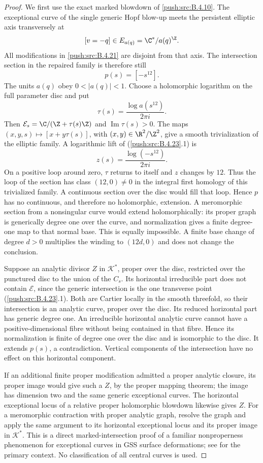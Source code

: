 \begin{proof}
We first use the exact marked blowdown of \ref{push:src:B.4.10}.
The exceptional curve of the single generic Hopf blow-up
meets the persistent elliptic axis transversely at
\[
 [v=-q]\in E_{a(q)}=\C^*/a(q)^{\Z}.
\]
All modifications in \ref{push:src:B.4.21} are disjoint from that axis.
The intersection section in the repaired family is therefore
still
\[
 p(s)=[-s^{12}].                                      \tag{B.4.23.1}
\]
The units $a(q)$ obey $0<|a(q)|<1$. Choose a holomorphic
logarithm on the full parameter disc and put
\[
 \tau(s)=\frac{\log a(s^{12})}{2\pi i}.
\]
Then $\mathcal E_s=\C/(\Z+\tau(s)\Z)$ and
$\operatorname{Im}\tau(s)>0$. The maps
$(x,y,s)\mapsto[x+y\tau(s)]$, with $(x,y)\in\R^2/\Z^2$,
give a smooth trivialization of the elliptic family.
A logarithmic lift of (\ref{push:src:B.4.23}.1) is
\[
 z(s)=\frac{\log(-s^{12})}{2\pi i}.
\]
On a positive loop around zero, $\tau$ returns to itself
and $z$ changes by $12$. Thus the loop of the section has
class $(12,0)\ne0$ in the integral first homology of this
trivialized family. A continuous section over the disc
would fill that loop. Hence $p$ has no continuous, and
therefore no holomorphic, extension. A meromorphic section
from a nonsingular curve would extend holomorphically:
its proper graph is generically degree one over the curve,
and normalization gives a finite degree-one map to that
normal base. This is equally impossible. A finite base
change of degree $d>0$ multiplies the winding to $(12d,0)$
and does not change the conclusion.

Suppose an analytic divisor $Z$ in $\mathcal K^*$, proper
over the disc, restricted over the punctured disc to the
union of the $C_s$. Its horizontal irreducible part does
not contain $\mathcal E$, since the generic intersection
is the one transverse point (\ref{push:src:B.4.23}.1). Both are Cartier
locally in the smooth threefold, so their intersection
is an analytic curve, proper over the disc. Its reduced
horizontal part has generic degree one. An irreducible
horizontal analytic curve cannot have a positive-dimensional
fibre without being contained in that fibre. Hence its
normalization is finite of degree one over the disc and
is isomorphic to the disc. It extends $p(s)$, a
contradiction. Vertical components of the intersection
have no effect on this horizontal component.

If an additional finite proper modification admitted a
proper analytic closure, its proper image would give
such a $Z$, by the proper mapping theorem; the image has
dimension two and the same generic exceptional curves.
The horizontal exceptional locus of a relative proper
holomorphic blowdown likewise gives $Z$. For a meromorphic
contraction with proper analytic graph, resolve the graph
and apply the same argument to its horizontal exceptional
locus and its proper image in $\mathcal K^*$.
This is a direct marked-intersection proof of a familiar
nonproperness phenomenon for exceptional curves in GSS
surface deformations; see
\citet[Section 1.2]{DlousskyTeleman2012AB} for the primary
context. No classification of all central curves is used.


\end{proof}

